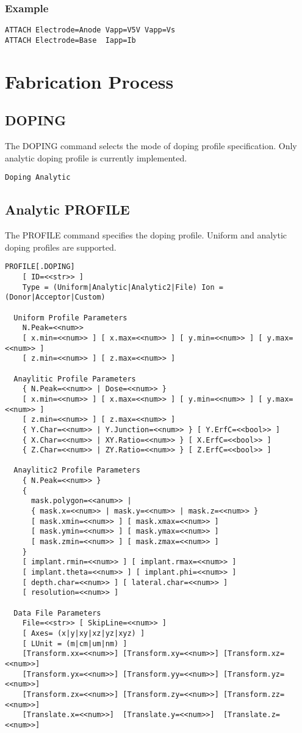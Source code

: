 \documentclass[oneside,12pt]{cgd_book}
\begin{document}
\subsubsection{Example}
\begin{lstlisting}[style=GeniusCode]
ATTACH Electrode=Anode Vapp=V5V Vapp=Vs
ATTACH Electrode=Base  Iapp=Ib
\end{lstlisting}
\section{Fabrication Process}
\par
\subsection{DOPING}
The DOPING command selects the mode of doping profile specification. Only analytic doping profile
        is currently implemented.
\par
\begin{lstlisting}[style=GeniusCmd]
Doping Analytic
\end{lstlisting}
\subsection{Analytic PROFILE}
The PROFILE command specifies the doping profile. Uniform and analytic doping profiles are
        supported.
\par
\begin{lstlisting}[style=GeniusCmd]
PROFILE[.DOPING]
    [ ID=<<str>> ]
    Type = (Uniform|Analytic|Analytic2|File) Ion = (Donor|Acceptor|Custom)

  Uniform Profile Parameters
    N.Peak=<<num>>
    [ x.min=<<num>> ] [ x.max=<<num>> ] [ y.min=<<num>> ] [ y.max=<<num>> ]
    [ z.min=<<num>> ] [ z.max=<<num>> ]

  Anaylitic Profile Parameters
    { N.Peak=<<num>> | Dose=<<num>> }
    [ x.min=<<num>> ] [ x.max=<<num>> ] [ y.min=<<num>> ] [ y.max=<<num>> ]
    [ z.min=<<num>> ] [ z.max=<<num>> ]
    { Y.Char=<<num>> | Y.Junction=<<num>> } [ Y.ErfC=<<bool>> ]
    { X.Char=<<num>> | XY.Ratio=<<num>> } [ X.ErfC=<<bool>> ]
    { Z.Char=<<num>> | ZY.Ratio=<<num>> } [ Z.ErfC=<<bool>> ]

  Anaylitic2 Profile Parameters
    { N.Peak=<<num>> }
    {
      mask.polygon=<<anum>> |
      { mask.x=<<num>> | mask.y=<<num>> | mask.z=<<num>> }
      [ mask.xmin=<<num>> ] [ mask.xmax=<<num>> ]
      [ mask.ymin=<<num>> ] [ mask.ymax=<<num>> ]
      [ mask.zmin=<<num>> ] [ mask.zmax=<<num>> ]
    }
    [ implant.rmin=<<num>> ] [ implant.rmax=<<num>> ]
    [ implant.theta=<<num>> ] [ implant.phi=<<num>> ]
    [ depth.char=<<num>> ] [ lateral.char=<<num>> ]
    [ resolution=<<num>> ]

  Data File Parameters
    File=<<str>> [ SkipLine=<<num>> ]
    [ Axes= (x|y|xy|xz|yz|xyz) ]
    [ LUnit = (m|cm|um|nm) ]
    [Transform.xx=<<num>>] [Transform.xy=<<num>>] [Transform.xz=<<num>>]
    [Transform.yx=<<num>>] [Transform.yy=<<num>>] [Transform.yz=<<num>>]
    [Transform.zx=<<num>>] [Transform.zy=<<num>>] [Transform.zz=<<num>>]
    [Translate.x=<<num>>]  [Translate.y=<<num>>]  [Translate.z=<<num>>]
\end{lstlisting}
\end{document}
